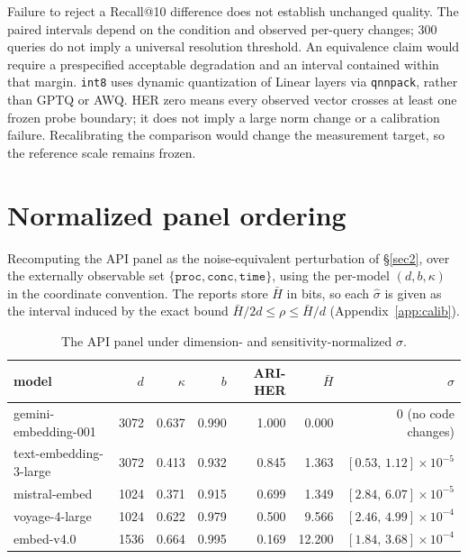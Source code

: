 \documentclass{article}
\begin{document}
Failure to reject a Recall@10 difference does not establish unchanged quality. The paired intervals depend on the condition and observed per-query changes; 300 queries do not imply a universal resolution threshold. An equivalence claim would require a prespecified acceptable degradation and an interval contained within that margin. \texttt{int8} uses dynamic quantization of Linear layers via \texttt{qnnpack}, rather than GPTQ or AWQ. HER zero means every observed vector crosses at least one frozen probe boundary; it does not imply a large norm change or a calibration failure. Recalibrating the comparison would change the measurement target, so the reference scale remains frozen.

\section{Normalized panel ordering}\label{app:panel}

Recomputing the API panel as the noise-equivalent perturbation of \S\ref{sec2}, over the externally observable set $\{\texttt{proc},\texttt{conc},\texttt{time}\}$, using the per-model $(d,b,\kappa)$ in the coordinate convention. The reports store $\bar H$ in bits, so each $\hat\sigma$ is given as the interval induced by the exact bound $\bar H/2d\le\rho\le\bar H/d$ (Appendix~\ref{app:calib}).

\begin{table}[h]
\centering\caption{The API panel under dimension- and sensitivity-normalized $\hat\sigma$.}\label{tab:normalized}\footnotesize\setlength{\tabcolsep}{4pt}
\begin{tabular}{lrrrrrr}
\toprule
model & $d$ & $\kappa$ & $b$ & ARI-HER & $\bar H$ & $\hat\sigma$ \\
\midrule
gemini-embedding-001 & 3072 & 0.637 & 0.990 & 1.000 & 0.000 & $0$ (no code changes) \\
text-embedding-3-large & 3072 & 0.413 & 0.932 & 0.845 & 1.363 & $[0.53,\,1.12]\times10^{-5}$ \\
mistral-embed & 1024 & 0.371 & 0.915 & 0.699 & 1.349 & $[2.84,\,6.07]\times10^{-5}$ \\
voyage-4-large & 1024 & 0.622 & 0.979 & 0.500 & 9.566 & $[2.46,\,4.99]\times10^{-4}$ \\
embed-v4.0 & 1536 & 0.664 & 0.995 & 0.169 & 12.200 & $[1.84,\,3.68]\times10^{-4}$ \\
\bottomrule
\end{tabular}
\end{table}
\end{document}
